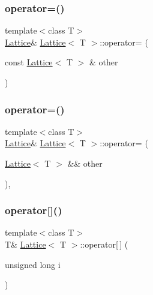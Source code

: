 \mbox{\label{class_lattice_acc09c6b9abeafc6b735c3b95d8537edf}} 
\subsubsection{\texorpdfstring{operator=()}{operator=()}\hspace{0.1cm}{\footnotesize\ttfamily [1/2]}}
{\footnotesize\ttfamily template$<$class T$>$ \\
\mbox{\hyperlink{class_lattice}{Lattice}}\& \mbox{\hyperlink{class_lattice}{Lattice}}$<$ T $>$\+::operator= (\begin{DoxyParamCaption}\item[{const \mbox{\hyperlink{class_lattice}{Lattice}}$<$ T $>$ \&}]{other }\end{DoxyParamCaption})\hspace{0.3cm}{\ttfamily [inline]}}

\mbox{\label{class_lattice_a29505c3ad95dc2695401c049cc34ba62}} 
\subsubsection{\texorpdfstring{operator=()}{operator=()}\hspace{0.1cm}{\footnotesize\ttfamily [2/2]}}
{\footnotesize\ttfamily template$<$class T$>$ \\
\mbox{\hyperlink{class_lattice}{Lattice}}\& \mbox{\hyperlink{class_lattice}{Lattice}}$<$ T $>$\+::operator= (\begin{DoxyParamCaption}\item[{\mbox{\hyperlink{class_lattice}{Lattice}}$<$ T $>$ \&\&}]{other }\end{DoxyParamCaption})\hspace{0.3cm}{\ttfamily [inline]}, {\ttfamily [noexcept]}}

\mbox{\label{class_lattice_ab7d585cf03c540d70ff91a58facbdef5}} 
\subsubsection{\texorpdfstring{operator[]()}{operator[]()}}
{\footnotesize\ttfamily template$<$class T$>$ \\
T\& \mbox{\hyperlink{class_lattice}{Lattice}}$<$ T $>$\+::operator\mbox{[}$\,$\mbox{]} (\begin{DoxyParamCaption}\item[{unsigned long}]{i }\end{DoxyParamCaption})\hspace{0.3cm}{\ttfamily [inline]}}

